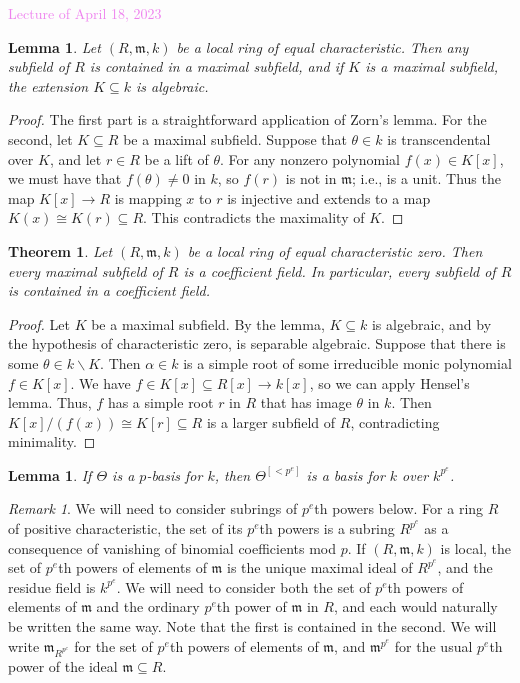 \documentclass{amsart}[12pt]
\newcommand{\Apr}[1]{\textcolor{violet}{Lecture of April #1, 2023}}
\newcommand{\fm}{{\mathfrak m}}
\numberwithin{equation}{section}
\theoremstyle{plain} %
\newtheorem{thm}[equation]{Theorem}
\newtheorem{lem}[equation]{Lemma}
\theoremstyle{definition}
\theoremstyle{remark}
\newtheorem{rem}[equation]{Remark}
\begin{document}
\Apr{18}

\begin{lem} Let $(R,\fm,k)$ be a local ring of equal characteristic. Then any subfield of $R$ is contained in a maximal subfield, and if $K$ is a maximal subfield, the extension $K\subseteq k$ is algebraic.
\end{lem}
\begin{proof} The first part is a straightforward application of Zorn's lemma. For the second, let $K\subseteq R$ be a maximal subfield. Suppose that $\theta\in k$ is transcendental over $K$, and let $r\in R$ be a lift of $\theta$. For any nonzero polynomial $f(x)\in K[x]$, we must have that $f(\theta)\neq 0$ in $k$, so $f(r)$ is not in $\fm$; i.e., is a unit. Thus the map $K[x]\to R$ is mapping $x$ to $r$ is injective and extends to a map $K(x) \cong K(r) \subseteq R$. This contradicts the maximality of $K$.
\end{proof}

\begin{thm} Let $(R,\fm,k)$ be a local ring of equal characteristic zero. Then every maximal subfield of $R$ is  a coefficient field. In particular, every subfield of $R$ is contained in a coefficient field.
\end{thm}
\begin{proof}
Let $K$ be a maximal subfield. By the lemma, $K\subseteq k$ is algebraic, and by the hypothesis of characteristic zero, is separable algebraic. Suppose that there is some $\theta \in k\smallsetminus K$. Then $\alpha \in k$ is a simple root of some irreducible monic polynomial $f\in K[x]$. We have $f\in K[x]\subseteq R[x] \to k[x]$, so we can apply Hensel's lemma. Thus, $f$ has a simple root $r$ in $R$ that has image $\theta$ in $k$. Then $K[x]/(f(x)) \cong K[r] \subseteq R$ is a larger subfield of $R$, contradicting minimality.
\end{proof} 

\begin{lem} If $\Theta$ is a $p$-basis for $k$, then $\Theta^{[<p^e]}$ is a basis for $k$ over $k^{p^e}$.
\end{lem}

\begin{rem} We will need to consider subrings of $p^e$th powers below. For a ring $R$ of positive characteristic, the set of its $p^e$th powers is a subring $R^{p^e}$ as a consequence of vanishing of binomial coefficients mod $p$. If $(R,\fm,k)$ is local, the set of $p^e$th powers of elements of $\fm$ is the unique maximal ideal of $R^{p^e}$, and the residue field is $k^{p^e}$. We will need to consider both the set of $p^e$th powers of elements of $\fm$ and the ordinary $p^e$th power of $\fm$ in $R$, and each would naturally be written the same way. Note that the first is contained in the second. We will write $\fm_{R^{p^e}}$ for the set of $p^e$th powers of elements of $\fm$, and $\fm^{p^e}$ for the usual $p^e$th power of the ideal $\fm\subseteq R$.
\end{rem}
\end{document}
